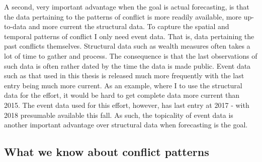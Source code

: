 \documentclass[a4paper]{article}
\begin{document}
A second, very important advantage when the goal is actual forecasting, is that the data pertaining to the patterns of conflict is more readily available, more up-to-data and more current the structural data. To capture the spatial and temporal patterns of conflict I only need event data. That is, data pertaining the past conflicts themselves. Structural data such as wealth measures often takes a lot of time to gather and process. The consequence is that the last observations of such data is often rather dated by the time the data is made public. Event data such as that used in this thesis is released much more frequently with the last entry being much more current. As an example, where I to use the structural data for the effort, it would be hard to get complete data more current than 2015. The event data used for this effort, however, has last entry at 2017 - with 2018 presumable available this fall. As such, the topicality of event data is another important advantage over structural data when forecasting is the goal.\par


\subsection{What we know about conflict patterns}



\end{document}

